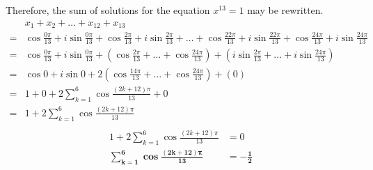 \documentclass[12pt]{report}
\begin{document}
Therefore, the sum of solutions for the equation $x^{13}=1$ may be rewritten.
\begin{align*}
&x_1+x_2+\dots+x_{12}+x_{13}\\
=&
\cos{\frac{0\pi}{13}} +i\sin{\frac{0\pi}{13}}+
\cos{\frac{2\pi}{13}} +i\sin{\frac{2\pi}{13}}+
\dots +
\cos{\frac{22\pi}{13}} +i\sin{\frac{22\pi}{13}}+
\cos{\frac{24\pi}{13}} +i\sin{\frac{24\pi}{13}} \\
=&
\cos{\frac{0\pi}{13}} +i\sin{\frac{0\pi}{13}}+
\left( \cos{\frac{2\pi}{13}}+\dots+\cos{\frac{24\pi}{13}} \right)+
\left( i\sin{\frac{2\pi}{13}}+\dots+i\sin{\frac{24\pi}{13}} \right) \\
=&
\cos{0} +i\sin{0}+
2\left( \cos{\frac{14\pi}{13}}+\dots+\cos{\frac{24\pi}{13}} \right)+
(0) \\
=&
1 + 0 + 2\sum_{k=1}^{6}\cos\frac{(2k+12)\pi}{13} + 0 \\
=&
1 + 2\sum_{k=1}^{6}\cos\frac{(2k+12)\pi}{13} \\
\end{align*}
\begin{align*}
1 + 2\sum_{k=1}^{6}\cos\frac{(2k+12)\pi}{13}&=0 \\
\boldsymbol{\sum_{k=1}^{6}\cos\frac{(2k+12)\pi}{13}}&\boldsymbol{=-\frac{1}{2}}
\end{align*}
\end{document}
